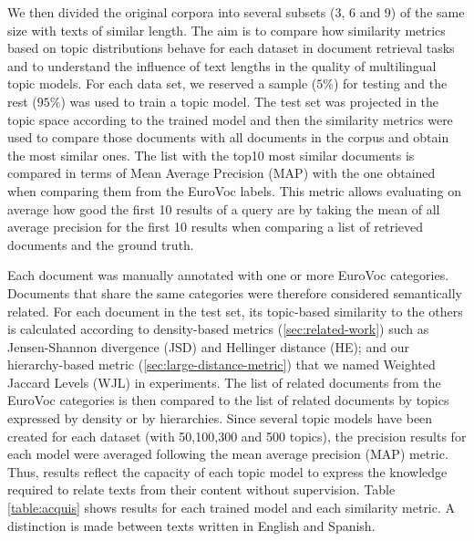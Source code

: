 We then divided the original corpora into several subsets (3, 6 and 9) of the same size with texts of similar length. The aim is to compare how similarity metrics based on topic distributions behave for each dataset in document retrieval tasks and to understand the influence of text lengths in the quality of multilingual topic models. For each data set, we reserved a sample ($5\%$) for testing and the rest ($95\%$) was used to train a topic model. The test set was projected in the topic space according to the trained model and then the similarity metrics were used to compare those documents with all documents in the corpus and obtain the most similar ones. The list with the top10 most similar documents is compared in terms of Mean Average Precision (MAP) with the one obtained when comparing them from the EuroVoc labels. This metric allows evaluating on average how good the first 10 results of a query are by taking the mean of all average precision for the first 10 results when comparing a list of retrieved documents and the ground truth.

Each document was manually annotated with one or more EuroVoc categories. Documents that share the same categories were therefore considered semantically related. For each document in the test set, its topic-based similarity to the others is calculated according to density-based metrics (\ref{sec:related-work}) such as Jensen-Shannon divergence (JSD) and Hellinger distance (HE); and our hierarchy-based metric (\ref{sec:large-distance-metric}) that we named Weighted Jaccard Levels (WJL) in experiments. The list of related documents from the EuroVoc categories is then compared to the list of related documents by topics expressed by density or by hierarchies. Since several topic models have been created for each dataset (with 50,100,300 and 500 topics), the precision results for each model were averaged following the mean average precision (MAP) metric. Thus, results reflect the capacity of each topic model to express the knowledge required to relate texts from their content without supervision. Table \ref{table:acquis} shows results for each trained model and each similarity metric. A distinction is made between texts written in English and Spanish. 


